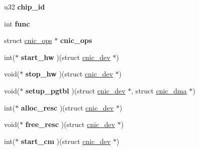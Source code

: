 \begin{DoxyCompactItemize}
\item 
\hypertarget{structcnic__local_a8f6a86d4d9c2da9b4e0c4d2401815624}{
u32 {\bfseries chip\_\-id}}
\label{structcnic__local_a8f6a86d4d9c2da9b4e0c4d2401815624}

\item 
\hypertarget{structcnic__local_a15577261bcf40e4afaf338a9cf13f556}{
int {\bfseries func}}
\label{structcnic__local_a15577261bcf40e4afaf338a9cf13f556}

\item 
\hypertarget{structcnic__local_aa9aa67c99e73e7a0fa9e5a8728f393ef}{
struct \hyperlink{structcnic__ops}{cnic\_\-ops} $\ast$ {\bfseries cnic\_\-ops}}
\label{structcnic__local_aa9aa67c99e73e7a0fa9e5a8728f393ef}

\item 
\hypertarget{structcnic__local_ad336bc17dd20c4f8e29ce039c220179b}{
int($\ast$ {\bfseries start\_\-hw} )(struct \hyperlink{structcnic__dev}{cnic\_\-dev} $\ast$)}
\label{structcnic__local_ad336bc17dd20c4f8e29ce039c220179b}

\item 
\hypertarget{structcnic__local_a0658aff35653ee22c210947afe7314a6}{
void($\ast$ {\bfseries stop\_\-hw} )(struct \hyperlink{structcnic__dev}{cnic\_\-dev} $\ast$)}
\label{structcnic__local_a0658aff35653ee22c210947afe7314a6}

\item 
\hypertarget{structcnic__local_a0739614622f040dc5220e3ce300622d9}{
void($\ast$ {\bfseries setup\_\-pgtbl} )(struct \hyperlink{structcnic__dev}{cnic\_\-dev} $\ast$, struct \hyperlink{structcnic__dma}{cnic\_\-dma} $\ast$)}
\label{structcnic__local_a0739614622f040dc5220e3ce300622d9}

\item 
\hypertarget{structcnic__local_a03191c9dab80e31228e90cd7951c439d}{
int($\ast$ {\bfseries alloc\_\-resc} )(struct \hyperlink{structcnic__dev}{cnic\_\-dev} $\ast$)}
\label{structcnic__local_a03191c9dab80e31228e90cd7951c439d}

\item 
\hypertarget{structcnic__local_aa642a21aa308c653376486efb0a1609e}{
void($\ast$ {\bfseries free\_\-resc} )(struct \hyperlink{structcnic__dev}{cnic\_\-dev} $\ast$)}
\label{structcnic__local_aa642a21aa308c653376486efb0a1609e}

\item 
\hypertarget{structcnic__local_a824589b7a95a5ac6fe5e8260e53a6488}{
int($\ast$ {\bfseries start\_\-cm} )(struct \hyperlink{structcnic__dev}{cnic\_\-dev} $\ast$)}
\label{structcnic__local_a824589b7a95a5ac6fe5e8260e53a6488}


\end{DoxyCompactItemize}

